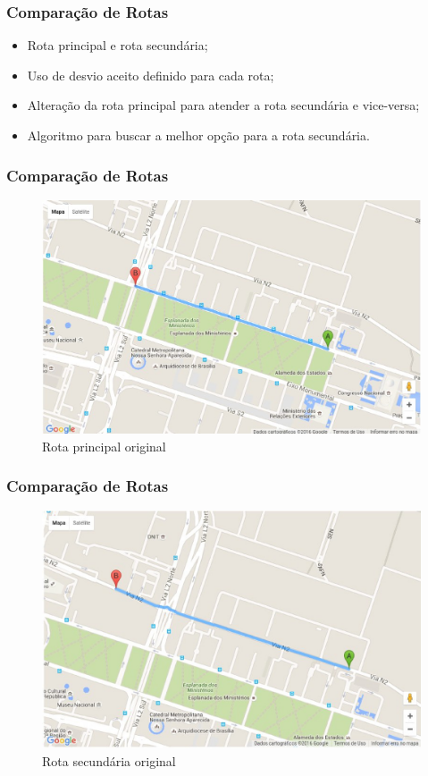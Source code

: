 \documentclass{beamer}
\begin{document}
\begin{frame}
\frametitle{Comparação de Rotas}

\begin{itemize}
	\item Rota principal e rota secundária;
	\item Uso de desvio aceito definido para cada rota;
	\item Alteração da rota principal para atender a rota secundária e vice-versa;
	\item Algoritmo para buscar a melhor opção para a rota secundária.
\end{itemize}

\end{frame}

\begin{frame}
\frametitle{Comparação de Rotas}

\begin{figure}[h]
	\centering
	\includegraphics[scale=0.35]{figuras/rota1.eps}
	\caption{Rota principal original}
\end{figure}

\end{frame}

\begin{frame}
\frametitle{Comparação de Rotas}

\begin{figure}[h]
	\centering
	\includegraphics[scale=0.35]{figuras/rota2.eps}
	\caption{Rota secundária original}
\end{figure}

\end{frame}
\end{document}
